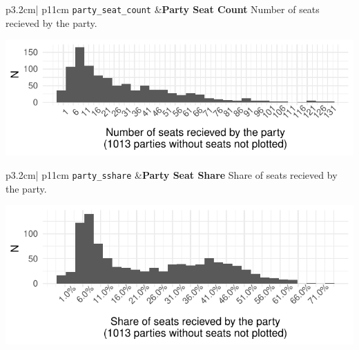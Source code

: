 \documentclass[
]{article}
\begin{document}
\begin{longtable}{p{3.2cm}| p{11cm}}
\texttt{party\_seat\_count} &\textbf{Party Seat Count}\newline 
Number of seats recieved by the party.

\hspace*{.25cm}
\begin{minipage}[t]{\linewidth }
\vspace{0pt}
\includegraphics[width = \linewidth]{cbelec/pscplot.pdf}
\end{minipage}


\end{longtable}

\begin{longtable}{p{3.2cm}| p{11cm}}
\texttt{party\_sshare} &\textbf{Party Seat Share}\newline 
Share of seats recieved by the party.

\hspace*{.25cm}
\begin{minipage}[t]{\linewidth }
\vspace{0pt}
\includegraphics[width = \linewidth]{cbelec/pssplot.pdf}
\end{minipage}


\end{longtable}
\end{document}
